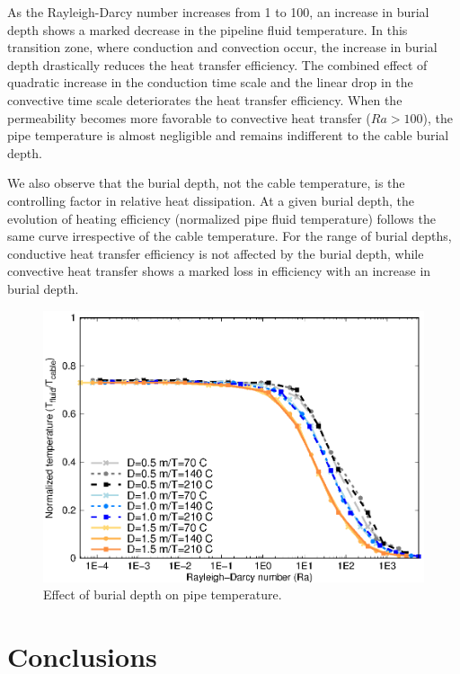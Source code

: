 \documentclass[Journal,letterpaper,InsideFigs]{ascelike-new}
\begin{document}
As the Rayleigh-Darcy number increases from 1 to 100, an increase in burial depth shows a marked decrease in the pipeline fluid temperature. In this transition zone, where conduction and convection occur, the increase in burial depth drastically reduces the heat transfer efficiency. The combined effect of quadratic increase in the conduction time scale and the linear drop in the convective time scale deteriorates the heat transfer efficiency. When the permeability becomes more favorable to convective heat transfer ($Ra > 100$), the pipe temperature is almost negligible and remains indifferent to the cable burial depth.

We also observe that the burial depth, not the cable temperature, is the controlling factor in relative heat dissipation. At a given burial depth, the evolution of heating efficiency (normalized pipe fluid temperature) follows the same curve irrespective of the cable temperature. For the range of burial depths, conductive heat transfer efficiency is not affected by the burial depth, while convective heat transfer shows a marked loss in efficiency with an increase in burial depth.

\begin{figure}
    \centering
    \includegraphics{figs/ra-tnorm-depth.eps}
    \caption{Effect of burial depth on pipe temperature.}
    \label{fig:ra-tnorm-depth}
\end{figure}

\section{Conclusions}
\end{document}
